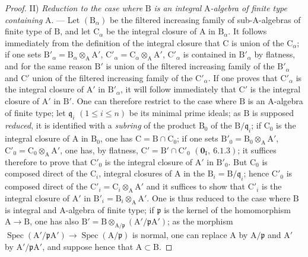 \begin{proof}
II) \emph{Reduction to the case where} $\mathrm{B}$ \emph{is an integral} $\mathrm{A}$\emph{-algebra of finite type containing} $\mathrm{A}$. --- Let $(\mathrm{B}_\alpha)$
be the filtered increasing family of sub-$\mathrm{A}$-algebras of finite type of $\mathrm{B}$, and let $\mathrm{C}_\alpha$ be the integral
closure of $\mathrm{A}$ in $\mathrm{B}_\alpha$. It follows immediately from the definition of the integral closure that $\mathrm{C}$
is union of the $\mathrm{C}_\alpha$; if one sets $\mathrm{B}'_\alpha=\mathrm{B}_\alpha\otimes_\mathrm{A}\mathrm{A}'$, $\mathrm{C}'_\alpha=\mathrm{C}_\alpha\otimes_\mathrm{A}\mathrm{A}'$, $\mathrm{C}'_\alpha$ is contained in $\mathrm{B}'_\alpha$
by flatness, and for the same reason $\mathrm{B}'$ is union of the filtered increasing family of the
$\mathrm{B}'_\alpha$ and $\mathrm{C}'$ union of the filtered increasing family of the $\mathrm{C}'_\alpha$. If one proves that $\mathrm{C}'_\alpha$
is the integral closure of $\mathrm{A}'$ in $\mathrm{B}'_\alpha$, it will follow immediately that $\mathrm{C}'$ is the integral
closure of $\mathrm{A}'$ in $\mathrm{B}'$. One can therefore restrict to the case where $\mathrm{B}$ is an $\mathrm{A}$-algebra of
finite type; let $\mathfrak{q}_i$ $(1\leqslant i\leqslant n)$ be its minimal prime ideals; as $\mathrm{B}$
is supposed \emph{reduced}, it is identified with a \emph{subring} of the product $\mathrm{B}_0$ of the $\mathrm{B}/\mathfrak{q}_i$; if $\mathrm{C}_0$ is the integral closure of $\mathrm{A}$ in $\mathrm{B}_0$, one has $\mathrm{C}=\mathrm{B}\cap\mathrm{C}_0$; if one sets $\mathrm{B}'_0=\mathrm{B}_0\otimes_\mathrm{A}\mathrm{A}'$, $\mathrm{C}'_0=\mathrm{C}_0\otimes_\mathrm{A}\mathrm{A}'$, one has,
by flatness, $\mathrm{C}'=\mathrm{B}'\cap\mathrm{C}'_0$ $(\mathbf{0}_\mathrm{I},~6.1.3)$; it suffices therefore to prove that $\mathrm{C}'_0$ is the integral
closure of $\mathrm{A}'$ in $\mathrm{B}'_0$. But $\mathrm{C}_0$ is composed direct of the $\mathrm{C}_i$, integral closures of $\mathrm{A}$ in the $\mathrm{B}_i=\mathrm{B}/\mathfrak{q}_i$; hence $\mathrm{C}'_0$ is composed direct of the $\mathrm{C}'_i=\mathrm{C}_i\otimes_\mathrm{A}\mathrm{A}'$ and it suffices to show that $\mathrm{C}'_i$ is the integral closure of $\mathrm{A}'$ in $\mathrm{B}'_i=\mathrm{B}_i\otimes_\mathrm{A}\mathrm{A}'$. One is thus reduced to the case where $\mathrm{B}$ is integral and $\mathrm{A}$-algebra of finite type; if $\mathfrak{p}$ is the kernel of the homomorphism $\mathrm{A}\to\mathrm{B}$, one has also $\mathrm{B}'=\mathrm{B}\otimes_{\mathrm{A}/\mathfrak{p}}(\mathrm{A}'/\mathfrak{p}\mathrm{A}')$; as the morphism $\operatorname{Spec}(\mathrm{A}'/\mathfrak{p}\mathrm{A}')\to\operatorname{Spec}(\mathrm{A}/\mathfrak{p})$ is normal, one can replace $\mathrm{A}$ by $\mathrm{A}/\mathfrak{p}$ and $\mathrm{A}'$ by $\mathrm{A}'/\mathfrak{p}\mathrm{A}'$, and suppose hence that $\mathrm{A}\subset\mathrm{B}$.


\end{proof}
